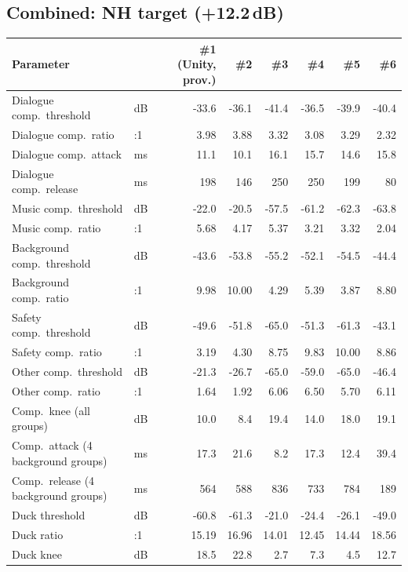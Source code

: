 \documentclass[11pt]{article}
\begin{document}
\subsection*{Combined: NH target (+12.2\,dB)}
\begin{table}[H]\centering\scriptsize
\begin{tabular}{@{}l l rrrrrr@{}}
\toprule
\textbf{Parameter} & & \textbf{\#1} \textbf{(Unity, prov.)} & \textbf{\#2} & \textbf{\#3} & \textbf{\#4} & \textbf{\#5} & \textbf{\#6} \\
\midrule
Dialogue comp.\ threshold & dB & -33.6 & -36.1 & -41.4 & -36.5 & -39.9 & -40.4 \\
Dialogue comp.\ ratio & :1 & 3.98 & 3.88 & 3.32 & 3.08 & 3.29 & 2.32 \\
Dialogue comp.\ attack & ms & 11.1 & 10.1 & 16.1 & 15.7 & 14.6 & 15.8 \\
Dialogue comp.\ release & ms & 198 & 146 & 250 & 250 & 199 & 80 \\
Music comp.\ threshold & dB & -22.0 & -20.5 & -57.5 & -61.2 & -62.3 & -63.8 \\
Music comp.\ ratio & :1 & 5.68 & 4.17 & 5.37 & 3.21 & 3.32 & 2.04 \\
Background comp.\ threshold & dB & -43.6 & -53.8 & -55.2 & -52.1 & -54.5 & -44.4 \\
Background comp.\ ratio & :1 & 9.98 & 10.00 & 4.29 & 5.39 & 3.87 & 8.80 \\
Safety comp.\ threshold & dB & -49.6 & -51.8 & -65.0 & -51.3 & -61.3 & -43.1 \\
Safety comp.\ ratio & :1 & 3.19 & 4.30 & 8.75 & 9.83 & 10.00 & 8.86 \\
Other comp.\ threshold & dB & -21.3 & -26.7 & -65.0 & -59.0 & -65.0 & -46.4 \\
Other comp.\ ratio & :1 & 1.64 & 1.92 & 6.06 & 6.50 & 5.70 & 6.11 \\
Comp.\ knee (all groups) & dB & 10.0 & 8.4 & 19.4 & 14.0 & 18.0 & 19.1 \\
Comp.\ attack (4 background groups) & ms & 17.3 & 21.6 & 8.2 & 17.3 & 12.4 & 39.4 \\
Comp.\ release (4 background groups) & ms & 564 & 588 & 836 & 733 & 784 & 189 \\
Duck threshold & dB & -60.8 & -61.3 & -21.0 & -24.4 & -26.1 & -49.0 \\
Duck ratio & :1 & 15.19 & 16.96 & 14.01 & 12.45 & 14.44 & 18.56 \\
Duck knee & dB & 18.5 & 22.8 & 2.7 & 7.3 & 4.5 & 12.7 \\

\end{tabular}
\end{table}
\end{document}
